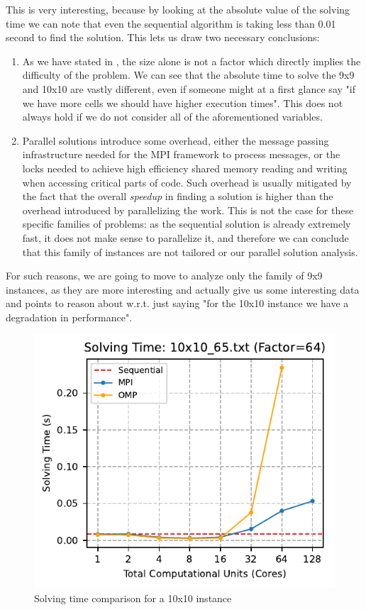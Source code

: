 This is very interesting, because by looking at the absolute value of the solving time we can note that even the sequential algorithm is taking less than 0.01 second to find the solution. This lets us draw two necessary conclusions:
\begin{enumerate}
    \item As we have stated in , the size alone is not a factor which directly implies the difficulty of the problem. We can see that the absolute time to solve the 9x9 and 10x10 are vastly different, even if someone might at a first glance say "if we have more cells we should have higher execution times". This does not always hold if we do not consider all of the aforementioned variables.
    \item Parallel solutions introduce some overhead, either the message passing infrastructure needed for the MPI framework to process messages, or the locks needed to achieve high efficiency shared memory reading and writing when accessing critical parts of code. Such overhead is usually mitigated by the fact that the overall \textit{speedup} in finding a solution is higher than the overhead introduced by parallelizing the work. This is not the case for these specific families of problems: as the sequential solution is already extremely fast, it does not make sense to parallelize it, and therefore we can conclude that this family of instances are not tailored or our parallel solution analysis.
\end{enumerate}

For such reasons, we are going to move to analyze only the family of 9x9 instances, as they are more interesting and actually give us some interesting data and points to reason about w.r.t. just saying "for the 10x10 instance we have a degradation in performance".

\begin{figure}[htbp]
\centering
\includegraphics[width=0.9\linewidth]{imgs/solving_time_mpi_omp_10x10_65.pdf}
\caption{Solving time comparison for a 10x10 instance}
\label{fig:comparison_solving_time_10x10}
\end{figure}

